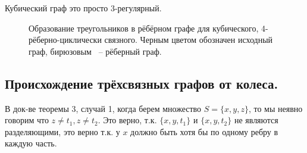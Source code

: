 Кубический граф это просто 3-регулярный.

\begin{figure}[ht]
    \centering
    \caption{Образование треугольников в рёбёрном графе для кубического, 4-рёберно-циклически связного. Черным цветом обозначен исходный граф, бирюзовым ~-- рёберный граф.}
    \label{fig:cubic_edge_4_cyclic_connected}
\end{figure}

\subsection{Происхождение трёхсвязных графов от колеса.}


В док-ве теоремы 3, случай 1, когда берем множество $S= \{x, y, z\}$, то мы неявно говорим что  $z \neq t_1, z \neq t_2$. Это верно, т.к. $\{x, y, t_1\}$ и $\{x, y, t_2\}$ не являются разделяющими, это верно т.к. у $x$ должно быть хотя бы по одному ребру в каждую часть.
